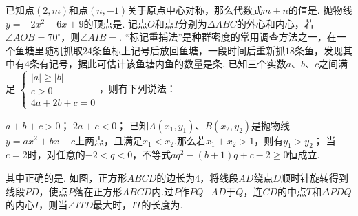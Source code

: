 \documentclass[10pt]{article}
\begin{document}
\begin{questions}{\complitingintroduction}
    \question 已知点$(2,m)$和点$(n,-1)$关于原点中心对称，那么代数式$m+n$的值是\complitingline.
    \question 抛物线$y=-2x^2-6x+9$的顶点是\complitingline.
    \question 记点$O$和点$I$分别为$\Delta ABC$的外心和内心，若$\angle AOB=70^{\circ}$，则$\angle AIB=$\complitingline.
    \question “标记重捕法”是种群密度的常用调查方法之一，在一个鱼塘里随机抓取$24$条鱼标上记号后放回鱼塘，一段时间后重新抓$18$条鱼，发现其中有$4$条有记号，据此可估计该鱼塘内鱼的数量是\complitingline 条.
    \question 已知三个实数$a$、$b$、$c$之间满足
    $\begin{cases}
        |a| \geq |b| \\
        c > 0 \\
        4a+2b+c = 0
    \end{cases}$，则有下列说法：
    \begin{subsubquestions}
        \subsubquestion $a+b+c>0$；
        \subsubquestion $2a+c<0$；
        \subsubquestion 已知$A(x_1,y_1)$、$B(x_2,y_2)$是抛物线$y=ax^2+bx+c$上两点，且满足$x_1<x_2$.那么若$x_1+x_2>1$，则有$y_1>y_2$；
        \subsubquestion 当$c=2$时，对任意的$-2<q<0$，不等式$aq^2-(b+1)q+c-2 \geq 0$恒成立.
    \end{subsubquestions}
    其中正确的是\complitingline.
    \question 如图，正方形$ABCD$的边长为$4$，将线段$AD$绕点$D$顺时针旋转得到线段$PD$，使点$P$落在正方形$ABCD$内.过$P$作$PQ \bot AD$于$Q$，连$CD$的中点$T$和$\Delta PDQ$的内心$I$，则当$\angle ITD$最大时，$IT$的长度为\complitingline.
    \begin{figure}[!htb]
        \raggedleft
    \end{figure}
\end{questions}
\end{document}
